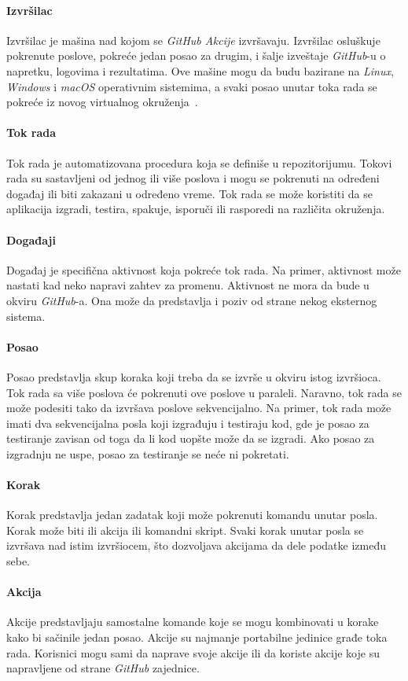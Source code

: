 \paragraph{Izvršilac}
Izvršilac je mašina nad kojom se \textit{GitHub Akcije} izvršavaju. Izvršilac osluškuje pokrenute poslove,
pokreće jedan posao za drugim, i šalje izveštaje \textit{GitHub}-u o napretku, logovima i rezultatima. Ove 
mašine mogu da budu bazirane na \textit{Linux}, \textit{Windows} i \textit{macOS} operativnim sistemima, a svaki posao 
unutar toka rada se pokreće iz novog virtualnog okruženja~\cite{GitHubActions}.

\paragraph{Tok rada}
Tok rada je automatizovana procedura koja se definiše u repozitorijumu. Tokovi rada su sastavljeni 
od jednog ili više poslova i mogu se pokrenuti na određeni događaj ili biti zakazani u određeno vreme. 
Tok rada se može koristiti da se aplikacija izgradi, testira, spakuje, isporuči ili rasporedi na 
različita okruženja.

\paragraph{Događaji}
Događaj je specifična aktivnost koja pokreće tok rada. Na primer, aktivnost može nastati kad neko napravi 
zahtev za promenu. Aktivnost ne mora da bude u okviru \textit{GitHub}-a. Ona može da predstavlja i poziv od strane 
nekog eksternog sistema.

\paragraph{Posao}
Posao predstavlja skup koraka koji treba da se izvrše u okviru istog izvršioca. Tok rada sa više poslova 
će pokrenuti ove poslove u paraleli. Naravno, tok rada se može podesiti tako da izvršava poslove 
sekvencijalno. Na primer, tok rada može imati dva sekvencijalna posla koji izgrađuju i testiraju kod, 
gde je posao za testiranje zavisan od toga da li kod uopšte može da se izgradi. Ako posao za izgradnju 
ne uspe, posao za testiranje se neće ni pokretati.

\paragraph{Korak}
Korak predstavlja jedan zadatak koji može pokrenuti komandu unutar posla. Korak može biti ili akcija ili 
komandni skript. Svaki korak unutar posla se izvršava nad istim izvršiocem, što dozvoljava akcijama da 
dele podatke između sebe.

\paragraph{Akcija}
Akcije predstavljaju samostalne komande koje se mogu kombinovati u korake kako bi sačinile jedan posao.
Akcije su najmanje portabilne jedinice građe toka rada. Korisnici mogu sami da naprave svoje akcije
ili da koriste akcije koje su napravljene od strane \textit{GitHub} zajednice. 
